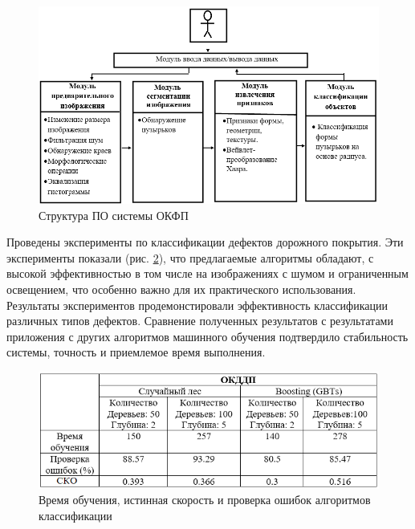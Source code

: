 \begin{figure}[ht!]
\centering
\vspace{-0.8em}
\includegraphics [width=1\linewidth]{images/pic59.png}
\caption{Структура ПО системы ОКФП} \label{pic59}
\end{figure}

Проведены эксперименты по классификации дефектов дорожного покрытия. Эти эксперименты показали (рис. \ref{pic1}), что предлагаемые алгоритмы обладают, с высокой эффективностью в том числе на изображениях с шумом и ограниченным освещением, что особенно важно для их практического использования. Результаты экспериментов продемонстировали эффективность классификации различных типов дефектов. Сравнение полученных результатов с результатами приложения с других алгоритмов машинного обучения подтвердило стабильность системы, точность и приемлемое время выполнения.
\begin{figure}[ht!]
\centering
\vspace{-0.8em}
\includegraphics [width=1\linewidth]{images/pic1.png}
\caption{Время обучения, истинная скорость и проверка ошибок алгоритмов классификации} \label{pic1}
\vspace{-0.8em}
\end{figure}


